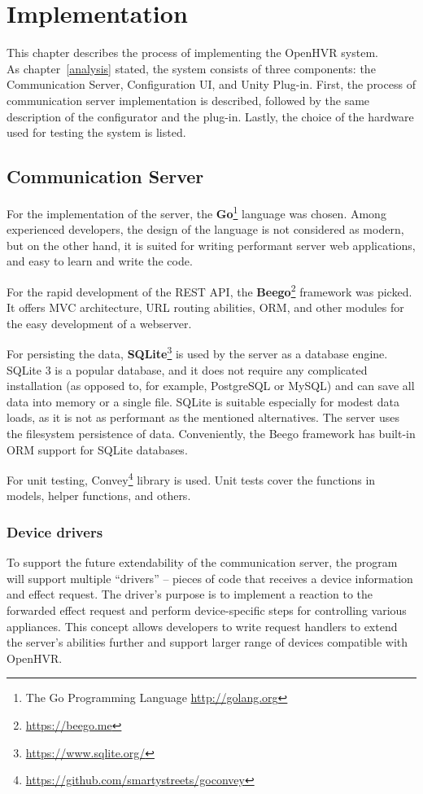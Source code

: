 \chapter{Implementation}\label{implementation}

This chapter describes the process of implementing the OpenHVR system. \\
As chapter~\ref{analysis} stated, the system consists of three components: the
Communication Server, Configuration UI, and Unity Plug-in. First, the process 
of communication server implementation is described,
followed by the same description of the configurator and the plug-in. 
Lastly, the choice of the hardware used for testing the system is listed.


\hypertarget{x-communication-server}{\section{Communication Server}}
For the implementation of the server, the
\textbf{Go}\footnote{The Go Programming Language \href{http://golang.org}{http://golang.org}} language was
chosen. Among experienced developers, the design of the language is not 
considered as modern,\,\cite{gogbu} but on the other hand, it is
suited for writing performant server web applications, and easy
to learn and write the code. 

For the rapid development of the REST API, the \textbf{Beego}\footnote{\href{https://beego.me}{https://beego.me}}
framework was picked. It offers MVC architecture, URL routing abilities, ORM,
and other modules for the easy development of a webserver.


For persisting the data, \textbf{SQLite}\footnote{\href{https://www.sqlite.org/}{https://www.sqlite.org/}}
is used by the server as a database engine. SQLite 3 is
a popular database, and it does not require any complicated installation
(as opposed to, for example, PostgreSQL or MySQL) and can save all data into
memory or a single file. SQLite is suitable especially for modest data loads, as
it is not as performant as the mentioned alternatives. The server uses the
filesystem persistence of data. Conveniently, the Beego framework has built-in
ORM support for SQLite databases.

For unit testing, Convey\footnote{\href{https://github.com/smartystreets/goconvey}{https://github.com/smartystreets/goconvey}}
library is used. Unit tests cover the functions in models, helper functions,
and others.

\subsection{Device drivers}
To support the future extendability of the communication server, the program
will support multiple ``drivers'' -- pieces of code that receives a device information 
and effect request. The driver's purpose is to implement a reaction to the 
forwarded effect request and perform device-specific steps for controlling
various appliances.
This concept allows developers to write request handlers to extend the server’s 
abilities further and support larger range of devices compatible with OpenHVR.

